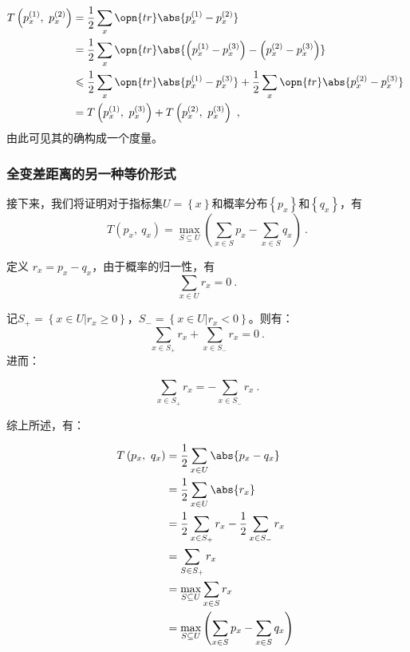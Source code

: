 \begin{equation}
\begin{aligned}
T\left(p_x^{(1)},~p_x^{(2)}\right) &= \frac{1}{2}\sum_x\opn{tr}\abs{p_x^{(1)} - p_x^{(2)}} \\
&= \frac{1}{2}\sum_x\opn{tr}\abs{\left(p_x^{(1)} - p_x^{(3)}\right) - \left(p_x^{(2)} - p_x^{(3)}\right)} \\
&\leqslant\frac{1}{2}\sum_x\opn{tr}\abs{p_x^{(1)} - p_x^{(3)}} + \frac{1}{2}\sum_x\opn{tr}\abs{p_x^{(2)} - p_x^{(3)}} \\
&=T\left(p_x^{(1)},~p_x^{(3)}\right)+T\left(p_x^{(2)},~p_x^{(3)}\right)~,
\end{aligned}~
\end{equation}
由此可见其的确构成一个度量。

\subsubsection{全变差距离的另一种等价形式}

接下来，我们将证明对于指标集$U = \left\{x\right\}$和概率分布$\left\{p_x\right\}$和$\left\{q_x\right\}$，有
\begin{equation}\label{eq_Trdist_2}
T\left(p_x,~q_x\right) = \max_{S \subseteq U}\left(\sum_{x\in S}p_x - \sum_{x\in S}q_x\right)~.
\end{equation}

定义 $r_x = p_x - q_x$，由于概率的归一性，有
\begin{equation}
\sum\limits_{x\in U}r_x = 0~.
\end{equation}


记$S_+ = \left\{x \in U | r_x \geqslant 0\right\}$，$S_- = \left\{x \in U | r_x < 0\right\}$。则有：
\begin{equation}
\sum_{x\in S_+}r_x + \sum_{x\in S_-}r_x = 0~.
\end{equation}
进而：

\begin{equation}
\sum_{x\in S_+}r_x = -\sum_{x\in S_-}r_x~.
\end{equation}

综上所述，有：

\begin{equation}
\begin{aligned}
T\left(p_x,~q_x\right) &= \frac{1}{2}\sum_{x\in U}\abs{p_x - q_x} \\
&= \frac{1}{2}\sum_{x\in U}\abs{r_x} \\
&= \frac{1}{2}\sum_{x\in S_+}r_x - \frac{1}{2}\sum_{x\in S_-}r_x \\
&= \sum_{S\in S_+}r_x \\
&= \max_{S \subseteq U}\sum_{x\in S}r_x \\
&= \max_{S\subseteq U}\left(\sum_{x\in S}p_x - \sum_{x\in S}q_x\right)
\end{aligned}~
\end{equation}

